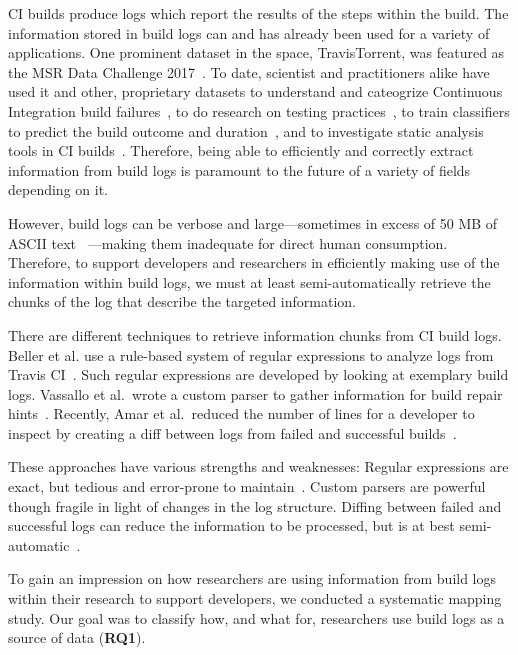 CI builds produce logs which report the results of the steps within
the build.
The information stored in build logs can and has
already been used for a variety of applications.
One prominent dataset
in the space, TravisTorrent, was featured as the MSR Data Challenge
2017~\cite{msr17challenge}.
To date, scientist and practitioners alike
have used it and other, proprietary datasets to understand and
cateogrize Continuous Integration build
failures~\cite{islam2017insights}, to do research on testing
practices~\cite{orellana2017differences}, to train classifiers to
predict the build outcome and
duration~\cite{ni2017cost,bisong2017built,machalica2019predictive},
and to investigate static analysis tools in CI
builds~\cite{zampetti2017open}.
Therefore, being able to efficiently
and correctly extract information from build logs is paramount to the
future of a variety of fields depending on it.

However, build logs can be verbose and large---sometimes in excess of
50 MB of ASCII text ~\cite{beller2017oops}---making them inadequate
for direct human consumption.
Therefore, to support developers and
researchers in efficiently making use of the information within build
logs, we must at least semi-automatically retrieve the chunks of the
log that describe the targeted information.

There are different techniques to retrieve information chunks from CI
build logs.
Beller et al.
use a rule-based system of regular
expressions to analyze logs from Travis CI~\cite{beller2017oops}.
Such regular expressions are developed by looking at exemplary build
logs.
Vassallo et al.\ wrote a custom parser to gather information
for build repair hints~\cite{vassallo2018un-break}.
Recently, Amar et
al.\ reduced the number of lines for a developer to inspect by
creating a diff between logs from failed and successful
builds~\cite{amar2019mining}.

These approaches have various strengths and weaknesses: Regular
expressions are exact, but tedious and error-prone to
maintain~\cite{michael2019regexes}.
Custom parsers are powerful
though fragile in light of changes in the log structure.
Diffing
between failed and successful logs can reduce the information to be
processed, but is at best semi-automatic~\cite{amar2019mining}.

To gain an impression on how researchers are using information from
build logs within their research to support
developers, we conducted a systematic mapping study.
Our goal was to classify how, and what for, researchers use build logs as
a source of data (\textbf{RQ1}).

